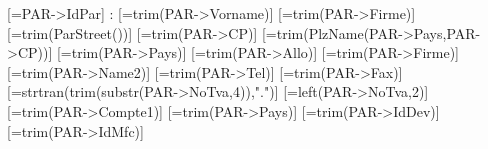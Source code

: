 [=PAR->IdPar] :
[=trim(PAR->Vorname)]
[=trim(PAR->Firme)]
[=trim(ParStreet())]
[=trim(PAR->CP)]
[=trim(PlzName(PAR->Pays,PAR->CP))]
[=trim(PAR->Pays)]
[=trim(PAR->Allo)]
[=trim(PAR->Firme)]
[=trim(PAR->Name2)]
[=trim(PAR->Tel)]
[=trim(PAR->Fax)]
[=strtran(trim(substr(PAR->NoTva,4)),".")]
[=left(PAR->NoTva,2)]
[=trim(PAR->Compte1)]
[=trim(PAR->Pays)]
[=trim(PAR->IdDev)]
[=trim(PAR->IdMfc)]


